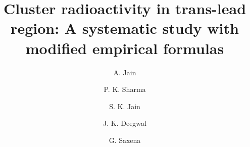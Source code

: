 \documentclass[preprint,10pt]{elsarticle}
\begin{document}
\begin{frontmatter}



\title{Cluster radioactivity in trans-lead region: A systematic study with modified empirical formulas}


\author[a,b,c]{A. Jain}\author[d]{P. K. Sharma}\author[a]{S. K. Jain}\author[e]{J. K. Deegwal}\author[c,f]{G. Saxena}
\address[a]{Department of Physics, School of Basic Sciences, Manipal University Jaipur, Jaipur-303007, India}
\address[b]{Department of Physics, S. S. Jain Subodh P.G.(Autonomous) College, Jaipur-302004, India}
\address[c]{Department of Physics (H\&S), Govt. Women Engineering College, Ajmer-305002, India}
\address[d]{Govt. Polytechnic College, Rajsamand-313324, India}
\address[e]{Govt. Women Engineering College, Ajmer-305002, India}
\address[f]{Department of Physics, Faculty of Science, University of Zagreb, Bijeni$\breve{c}$ka c. 32, 10000 Zagreb, Croatia.}


\end{frontmatter}
\end{document}
